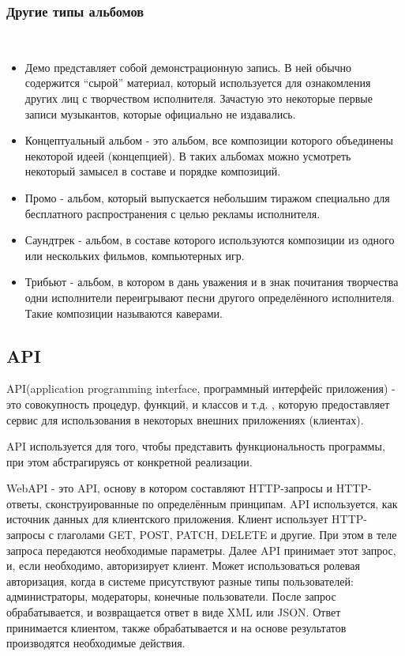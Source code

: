\subsubsection{Другие типы альбомов}
\label{sub:domain:music_album:other_types_classification}
~\\
\begin{itemize}
  \item Демо представляет собой демонстрационную запись. В ней обычно содержится “сырой” материал, который используется для ознакомления других лиц с творчеством исполнителя. Зачастую это некоторые первые записи музыкантов, которые официально не издавались.
  \item Концептуальный альбом - это альбом, все композиции которого объединены некоторой идеей (концепцией). В таких альбомах можно усмотреть некоторый замысел в составе и порядке композиций.
  \item Промо - альбом, который выпускается небольшим тиражом специально для бесплатного распространения с целью рекламы исполнителя.
  \item Саундтрек - альбом, в составе которого используются композиции из одного или нескольких фильмов, компьютерных игр.
  \item Трибьют - альбом, в котором в дань уважения и в знак почитания творчества одни исполнители переигрывают песни другого определённого исполнителя. Такие композиции называются каверами.
\end{itemize}

\subsection{API}
\label{sub:domain:api}
API(application programming interface, программный интерфейс приложения) - это совокупность процедур, функций, и классов и т.д. , которую предоставляет сервис для использования в некоторых внешних приложениях (клиентах).

API используется для того, чтобы представить функциональность программы, при этом абстрагируясь от конкретной реализации.

WebAPI - это API, основу в котором составляют HTTP-запросы и HTTP-ответы, сконструированные по определённым принципам. API используется, как источник данных для клиентского приложения. Клиент использует HTTP-запросы с глаголами GET, POST, PATCH, DELETE и другие. При этом в теле запроса передаются необходимые параметры. Далее API принимает этот запрос, и, если необходимо, авторизирует клиент. Может использоваться ролевая авторизация, когда в системе присутствуют разные типы пользователей: администраторы, модераторы, конечные пользователи. После запрос обрабатывается, и возвращается ответ в виде XML или JSON. Ответ принимается клиентом, также обрабатывается и на основе результатов производятся необходимые действия.
